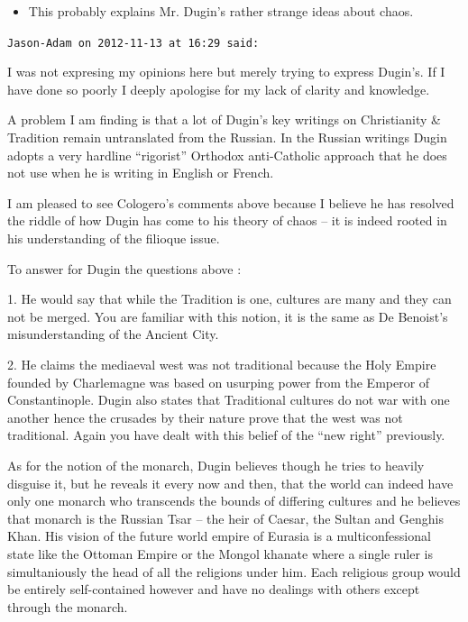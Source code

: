 \begin{footnotesize}
\begin{sffamily}
\begin{itemize}
\item This probably explains Mr. Dugin's rather strange ideas about chaos.
\end{itemize}


\hfill

\texttt{Jason-Adam on 2012-11-13 at 16:29 said:}

I was not expresing my opinions here but merely trying to express Dugin's. If I have done so poorly I deeply apologise for my lack of clarity and knowledge.

A problem I am finding is that a lot of Dugin's key writings on Christianity \& Tradition remain untranslated from the Russian. In the Russian writings Dugin adopts a very hardline ``rigorist'' Orthodox anti-Catholic approach that he does not use when he is writing in English or French.

I am pleased to see Cologero's comments above because I believe he has resolved the riddle of how Dugin has come to his theory of chaos -- it is indeed rooted in his understanding of the filioque issue.

To answer for Dugin the questions above :

1. He would say that while the Tradition is one, cultures are many and they can not be merged. You are familiar with this notion, it is the same as De Benoist's misunderstanding of the Ancient City.

2. He claims the mediaeval west was not traditional because the Holy Empire founded by Charlemagne was based on usurping power from the Emperor of Constantinople. Dugin also states that Traditional cultures do not war with one another hence the crusades by their nature prove that the west was not traditional. Again you have dealt with this belief of the ``new right'' previously.

As for the notion of the monarch, Dugin believes though he tries to heavily disguise it, but he reveals it every now and then, that the world can indeed have only one monarch who transcends the bounds of differing cultures and he believes that monarch is the Russian Tsar -- the heir of Caesar, the Sultan and Genghis Khan. His vision of the future world empire of Eurasia is a multiconfessional state like the Ottoman Empire or the Mongol khanate where a single ruler is simultaniously the head of all the religions under him. Each religious group would be entirely self-contained however and have no dealings with others except through the monarch.

\hfill


\end{sffamily}
\end{footnotesize}
